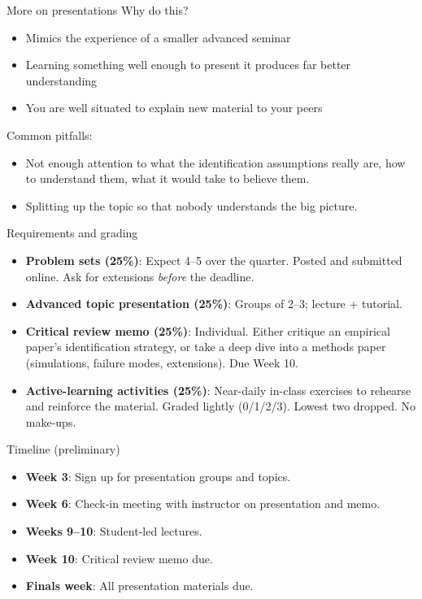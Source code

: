 \documentclass[xcolor=dvipsnames]{beamer}
\begin{document}
\begin{frame}{More on presentations}
\small
{} Why do this?\\
\footnotesize
\begin{itemize}
\item Mimics the experience of a smaller advanced seminar
\item Learning something well enough to present it produces far better understanding
\item You are well situated to explain new material to your peers
\end{itemize}
\small
\medskip
{} Common pitfalls: \\
\footnotesize
\begin{itemize}
\item Not enough attention to what the identification assumptions really are, how to understand them, what it would take to believe them.
\item Splitting up the topic so that nobody understands the big picture.
\end{itemize}
\end{frame}


\begin{frame}{Requirements and grading}
\small
\begin{itemize}
\item<1-> \textbf{Problem sets (25\%)}: Expect 4--5 over the quarter. Posted and submitted online. Ask for extensions \textit{before} the deadline.
\medskip
\item<2-> \textbf{Advanced topic presentation (25\%)}: Groups of 2--3; lecture + tutorial.
\medskip
\item<3-> \textbf{Critical review memo (25\%)}: Individual. Either critique an empirical paper's identification strategy, or take a deep dive into a methods paper (simulations, failure modes, extensions). Due Week 10.
\medskip
\item<4-> \textbf{Active-learning activities (25\%)}: Near-daily in-class exercises to rehearse and reinforce the material. Graded lightly (0/1/2/3). Lowest two dropped. No make-ups.
\end{itemize}
\end{frame}

\begin{frame}{Timeline (preliminary)}
\begin{itemize}
\item \textbf{Week 3}: Sign up for presentation groups and topics.
\medskip
\item \textbf{Week 6}: Check-in meeting with instructor on presentation and memo.
\medskip
\item \textbf{Weeks 9--10}: Student-led lectures.
\medskip
\item \textbf{Week 10}: Critical review memo due.
\medskip
\item \textbf{Finals week}: All presentation materials due.
\end{itemize}
\end{frame}
\end{document}

